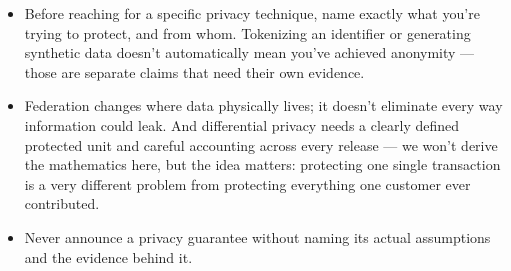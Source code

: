 \documentclass[11pt,a4paper]{article}
\begin{document}
\begin{examplebox}[title after break={SPOKEN SCRIPT --- slide 44 continued}]
\begin{itemize}
\item Before reaching for a specific privacy technique, name exactly what you're trying to protect, and from whom. Tokenizing an identifier or generating synthetic data doesn't automatically mean you've achieved anonymity — those are separate claims that need their own evidence.
\item Federation changes where data physically lives; it doesn't eliminate every way information could leak. And differential privacy needs a clearly defined protected unit and careful accounting across every release — we won't derive the mathematics here, but the idea matters: protecting one single transaction is a very different problem from protecting everything one customer ever contributed.
\item Never announce a privacy guarantee without naming its actual assumptions and the evidence behind it.
\end{itemize}
\end{examplebox}
\par\noindent{\scriptsize\textcolor{teal!60!black}{Reading anchor: Bass, Ch. 9–10 / §14.2 · NIST SP 800-226}}
\clearpage
\end{document}
